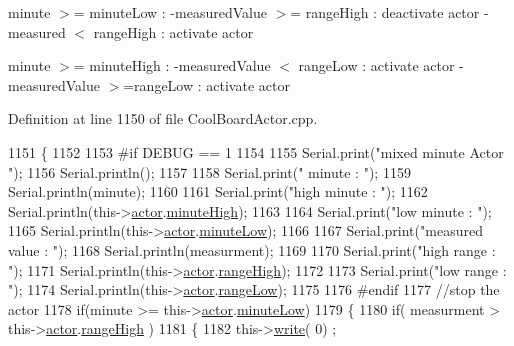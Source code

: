 minute $>$= minute\+Low \+: -\/measured\+Value $>$= range\+High \+: deactivate actor -\/measured $<$ range\+High \+: activate actor

minute $>$= minute\+High \+: -\/measured\+Value $<$ range\+Low \+: activate actor -\/measured\+Value $>$=range\+Low \+: activate actor 

Definition at line 1150 of file Cool\+Board\+Actor.\+cpp.


\begin{DoxyCode}
1151 \{
1152 
1153 \textcolor{preprocessor}{#if DEBUG == 1}
1154     
1155     Serial.print(\textcolor{stringliteral}{"mixed minute Actor "});
1156     Serial.println();
1157 
1158     Serial.print(\textcolor{stringliteral}{" minute : "});
1159     Serial.println(minute);
1160 
1161     Serial.print(\textcolor{stringliteral}{"high minute : "});
1162     Serial.println(this->\hyperlink{class_cool_board_actor_a8f190db9f7a39fddbcef7f152da970e9}{actor}.\hyperlink{struct_cool_board_actor_1_1state_a4bff3d61ead74adb60be224764b93006}{minuteHigh});
1163 
1164     Serial.print(\textcolor{stringliteral}{"low minute : "});
1165     Serial.println(this->\hyperlink{class_cool_board_actor_a8f190db9f7a39fddbcef7f152da970e9}{actor}.\hyperlink{struct_cool_board_actor_1_1state_acbcc2902331fd9d757cd475eb403bdd9}{minuteLow});
1166 
1167     Serial.print(\textcolor{stringliteral}{"measured value : "});
1168     Serial.println(measurment);
1169 
1170     Serial.print(\textcolor{stringliteral}{"high range : "});
1171     Serial.println(this->\hyperlink{class_cool_board_actor_a8f190db9f7a39fddbcef7f152da970e9}{actor}.\hyperlink{struct_cool_board_actor_1_1state_a6e5cd6c5cd44e2decfd8d4df1853f8e3}{rangeHigh});
1172 
1173     Serial.print(\textcolor{stringliteral}{"low range : "});
1174     Serial.println(this->\hyperlink{class_cool_board_actor_a8f190db9f7a39fddbcef7f152da970e9}{actor}.\hyperlink{struct_cool_board_actor_1_1state_a43f891c9fb3bb63575c27cec860de55a}{rangeLow});
1175 
1176 \textcolor{preprocessor}{#endif}
1177     \textcolor{comment}{//stop the actor    }
1178     \textcolor{keywordflow}{if}(minute >= this->\hyperlink{class_cool_board_actor_a8f190db9f7a39fddbcef7f152da970e9}{actor}.\hyperlink{struct_cool_board_actor_1_1state_acbcc2902331fd9d757cd475eb403bdd9}{minuteLow})
1179     \{
1180             \textcolor{keywordflow}{if}( measurment > this->\hyperlink{class_cool_board_actor_a8f190db9f7a39fddbcef7f152da970e9}{actor}.\hyperlink{struct_cool_board_actor_1_1state_a6e5cd6c5cd44e2decfd8d4df1853f8e3}{rangeHigh} )
1181             \{
1182                 this->\hyperlink{class_cool_board_actor_a958786ff01ea1056ee72c72d439f86da}{write}( 0) ;

\end{DoxyCode}
